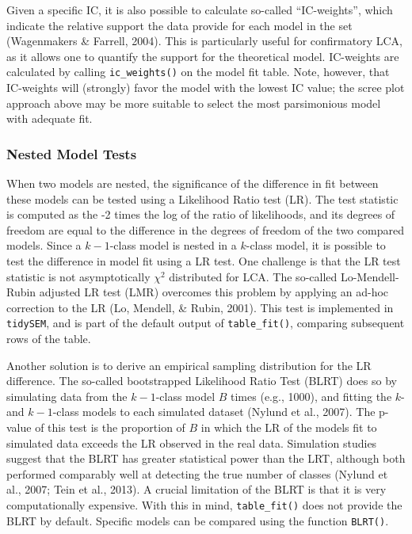 \documentclass[
  ,man,floatsintext]{apa6}
\begin{document}
Given a specific IC,
it is also possible to calculate so-called ``IC-weights'',
which indicate the relative support the data provide for each model in the set (Wagenmakers \& Farrell, 2004).
This is particularly useful for confirmatory LCA,
as it allows one to quantify the support for the theoretical model.
IC-weights are calculated by calling \texttt{ic\_weights()} on the model fit table.
Note, however, that IC-weights will (strongly) favor the model with the lowest IC value;
the scree plot approach above may be more suitable to select the most parsimonious model with adequate fit.

\hypertarget{nested-model-tests}{%
\subsubsection{Nested Model Tests}\label{nested-model-tests}}

When two models are nested, the significance of the difference in fit between these models can be tested using a Likelihood Ratio test (LR).
The test statistic is computed as the -2 times the log of the ratio of likelihoods,
and its degrees of freedom are equal to the difference in the degrees of freedom of the two compared models.
Since a \(k-1\)-class model is nested in a \(k\)-class model,
it is possible to test the difference in model fit using a LR test.
One challenge is that the LR test statistic is not asymptotically \(\chi^2\) distributed for LCA.
The so-called Lo-Mendell-Rubin adjusted LR test (LMR) overcomes this problem by applying an ad-hoc correction to the LR (Lo, Mendell, \& Rubin, 2001).
This test is implemented in \texttt{tidySEM}, and is part of the default output of \texttt{table\_fit()}, comparing subsequent rows of the table.

Another solution is to derive an empirical sampling distribution for the LR difference.
The so-called bootstrapped Likelihood Ratio Test (BLRT) does so by simulating data from the \(k-1\)-class model \(B\) times (e.g., 1000),
and fitting the \(k\)- and \(k-1\)-class models to each simulated dataset (Nylund et al., 2007).
The p-value of this test is the proportion of \(B\) in which the LR of the models fit to simulated data exceeds the LR observed in the real data.
Simulation studies suggest that the BLRT has greater statistical power than the LRT,
although both performed comparably well at detecting the true number of classes (Nylund et al., 2007; Tein et al., 2013).
A crucial limitation of the BLRT is that it is very computationally expensive.
With this in mind, \texttt{table\_fit()} does not provide the BLRT by default.
Specific models can be compared using the function \texttt{BLRT()}.
\end{document}
